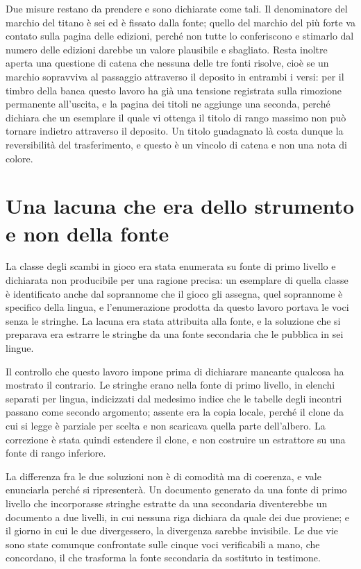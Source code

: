 Due misure restano da prendere e sono dichiarate come tali. Il denominatore del marchio del titano è sei ed è fissato dalla fonte; quello del marchio del più forte va contato sulla pagina delle edizioni, perché non tutte lo conferiscono e stimarlo dal numero delle edizioni darebbe un valore plausibile e sbagliato. Resta inoltre aperta una questione di catena che nessuna delle tre fonti risolve, cioè se un marchio sopravviva al passaggio attraverso il deposito in entrambi i versi: per il timbro della banca questo lavoro ha già una tensione registrata sulla rimozione permanente all'uscita, e la pagina dei titoli ne aggiunge una seconda, perché dichiara che un esemplare il quale vi ottenga il titolo di rango massimo non può tornare indietro attraverso il deposito. Un titolo guadagnato là costa dunque la reversibilità del trasferimento, e questo è un vincolo di catena e non una nota di colore.

\section{Una lacuna che era dello strumento e non della fonte}

La classe degli scambi in gioco era stata enumerata su fonte di primo livello e dichiarata non producibile per una ragione precisa: un esemplare di quella classe è identificato anche dal soprannome che il gioco gli assegna, quel soprannome è specifico della lingua, e l'enumerazione prodotta da questo lavoro portava le voci senza le stringhe. La lacuna era stata attribuita alla fonte, e la soluzione che si preparava era estrarre le stringhe da una fonte secondaria che le pubblica in sei lingue.

Il controllo che questo lavoro impone prima di dichiarare mancante qualcosa ha mostrato il contrario. Le stringhe erano nella fonte di primo livello, in elenchi separati per lingua, indicizzati dal medesimo indice che le tabelle degli incontri passano come secondo argomento; assente era la copia locale, perché il clone da cui si legge è parziale per scelta e non scaricava quella parte dell'albero. La correzione è stata quindi estendere il clone, e non costruire un estrattore su una fonte di rango inferiore.

La differenza fra le due soluzioni non è di comodità ma di coerenza, e vale enunciarla perché si ripresenterà. Un documento generato da una fonte di primo livello che incorporasse stringhe estratte da una secondaria diventerebbe un documento a due livelli, in cui nessuna riga dichiara da quale dei due proviene; e il giorno in cui le due divergessero, la divergenza sarebbe invisibile. Le due vie sono state comunque confrontate sulle cinque voci verificabili a mano, che concordano, il che trasforma la fonte secondaria da sostituto in testimone.

